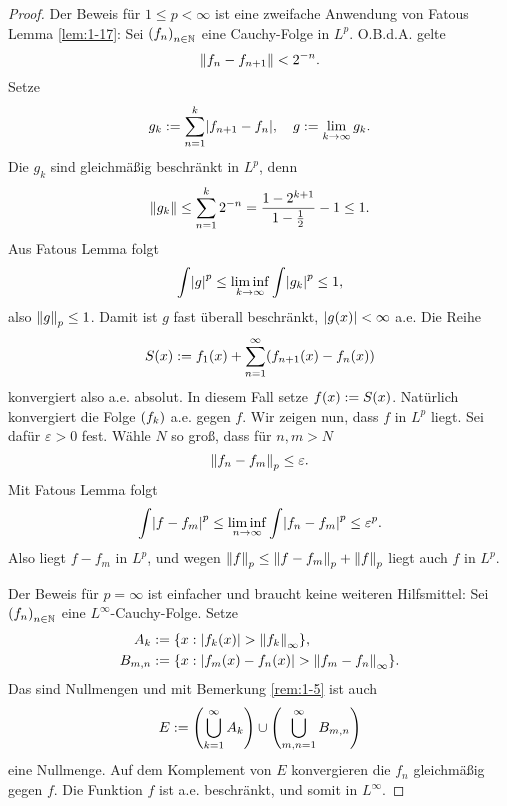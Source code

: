 \begin{proof}
	Der Beweis für \(1 \le p < \infty\) ist eine zweifache Anwendung von Fatous Lemma \ref{lem:1-17}:
	Sei \(\parentheses*{f_n}_{n \in \N}\) eine Cauchy-Folge in \(L^p\).
	O.B.d.A. gelte
	\begin{equation}
		\norm*{f_n - f_{n + 1}} < 2^{-n}.
	\end{equation}
	Setze
	\begin{equation}
		g_k := \sum_{n = 1}^k \absolute*{f_{n + 1} - f_n}, \quad g := \lim_{k \to \infty}g_k.
	\end{equation}
	Die \(g_k\) sind gleichmäßig beschränkt in \(L^p\), denn
	\begin{equation}
		\norm*{g_k} \le \sum_{n = 1}^k 2^{-n} = \frac{1 - 2^{k + 1}}{1 - \frac{1}{2}} - 1 \le 1.
	\end{equation}
	Aus Fatous Lemma folgt
	\[
		\int\absolute*{g}^p \le \liminf_{k \to \infty}\int\absolute*{g_k}^p \le 1,
	\]
	also \(\norm*{g}_p \le 1\).
	Damit ist \(g\) fast überall beschränkt, \(\absolute*{g\parentheses*{x}} < \infty\) a.e.
	Die Reihe
	\begin{equation}
		S\parentheses*{x} := f_1\parentheses*{x} + \sum_{n = 1}^\infty \parentheses*{f_{n + 1}\parentheses*{x} - f_n\parentheses*{x}}
	\end{equation}
	konvergiert also a.e. absolut.
	In diesem Fall setze \(f\parentheses*{x} := S\parentheses*{x}\).
	Natürlich konvergiert die Folge \(\parentheses*{f_k}\) a.e. gegen \(f\).
	Wir zeigen nun, dass \(f\) in \(L^p\) liegt.
	Sei dafür \(\varepsilon > 0\) fest.
	Wähle \(N\) so groß, dass für \(n, m > N\)
	\[
		\norm*{f_n - f_m}_p \le \varepsilon.
	\]
	Mit Fatous Lemma folgt
	\[
		\int\absolute*{f - f_m}^p \le \liminf_{n \to \infty}\int\absolute*{f_n - f_m}^p \le \varepsilon^p.
	\]
	Also liegt \(f - f_m\) in \(L^p\), und wegen \(\norm*{f}_p \le \norm*{f - f_m}_p + \norm*{f}_p\) liegt auch \(f\) in \(L^p\).

	Der Beweis für \(p = \infty\) ist einfacher und braucht keine weiteren Hilfsmittel:
	Sei \(\parentheses*{f_n}_{n \in \N}\) eine \(L^\infty\)-Cauchy-Folge.
	Setze
	\begin{align*}
		A_k &:= \braces*{x : \absolute*{f_k\parentheses*{x}} > \norm*{f_k}_\infty},\\
		B_{m, n} &:= \braces*{x : \absolute*{f_m\parentheses*{x} - f_n\parentheses*{x}} > \norm*{f_m - f_n}_\infty}.
	\end{align*}
	Das sind Nullmengen und mit Bemerkung \ref{rem:1-5} ist auch
	\[
		E := \parentheses*{\bigcup_{k = 1}^\infty A_k} \cup \parentheses*{\bigcup_{m, n = 1}^\infty B_{m, n}}
	\]
	eine Nullmenge.
	Auf dem Komplement von \(E\) konvergieren die \(f_n\) gleichmäßig gegen \(f\).
	Die Funktion \(f\) ist a.e. beschränkt, und somit in \(L^\infty\).
\end{proof}
